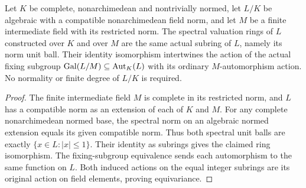 \begin{lemma}
\label{fw:spectral-base-integers}
\leanok
Let $K$ be complete, nonarchimedean and nontrivially normed, let
$L/K$ be algebraic with a compatible nonarchimedean field norm,
and let $M$ be a finite intermediate field with its restricted norm.
The spectral valuation rings of $L$ constructed over $K$ and over
$M$ are the same actual subring of $L$, namely its norm unit ball.
Their identity isomorphism intertwines the action of the actual
fixing subgroup $\operatorname{Gal}(L/M)\subseteq\operatorname{Aut}_K(L)$
with its ordinary $M$-automorphism action. No normality or finite
degree of $L/K$ is required.
\end{lemma}
\begin{proof}
The finite intermediate field $M$ is complete in its restricted
norm, and $L$ has a compatible norm as an extension of each of
$K$ and $M$. For any complete nonarchimedean normed base, the
spectral norm on an algebraic normed extension equals its given
compatible norm. Thus both spectral unit balls are exactly
$\{x\in L:|x|\leq1\}$. Their identity as subrings gives the
claimed ring isomorphism. The fixing-subgroup equivalence sends
each automorphism to the same function on $L$. Both induced
actions on the equal integer subrings are its original action
on field elements, proving equivariance.
\end{proof}

